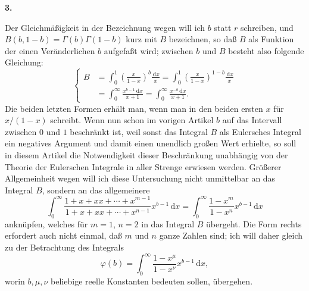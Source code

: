 \documentclass[11pt]{article}
\newcommand{\dd}{\,\mathrm d}
\newcommand{\art}[1]{\bigskip\begin{center}\large\bfseries #1.\end{center}\nopagebreak}
\begin{document}
\art{3}

Der Gleichmäßigkeit in der Bezeichnung wegen will ich $b$ statt $r$ schreiben, und $B(b,1-b)=\Gamma(b)\Gamma(1-b)$ kurz mit $B$ bezeichnen, so daß $B$ als Funktion der einen Veränderlichen $b$ aufgefaßt wird; zwischen $b$ und $B$ besteht also folgende Gleichung:
\begin{equation}
\left\{
\begin{aligned}
B&=\int_0^1 \left(\frac{x}{1-x}\right)^b\frac{\dd x}{x}
  =\int_0^1 \left(\frac{x}{1-x}\right)^{1-b}\frac{\dd x}{x} \\
&=\int_0^\infty \frac{x^{b-1}\dd x}{x+1}
  =\int_0^\infty \frac{x^{-b}\dd x}{x+1}.
\end{aligned}
\right.
\tag{8}
\end{equation}
Die beiden letzten Formen erhält man, wenn man in den beiden ersten $x$ für $x/(1-x)$ schreibt. Wenn nun schon im vorigen Artikel $b$ auf das Intervall zwischen $0$ und $1$ beschränkt ist, weil sonst das Integral $B$ als Eulersches Integral ein negatives Argument und damit einen unendlich großen Wert erhielte, so soll in diesem Artikel die Notwendigkeit dieser Beschränkung unabhängig von der Theorie der Eulerschen Integrale in aller Strenge erwiesen werden. Größerer Allgemeinheit wegen will ich diese Untersuchung nicht unmittelbar an das Integral $B$, sondern an das allgemeinere
\[
\int_0^\infty \frac{1+x+xx+\cdots+x^{m-1}}{1+x+xx+\cdots+x^{n-1}}x^{b-1}\dd x
=\int_0^\infty \frac{1-x^m}{1-x^n}x^{b-1}\dd x
\]
anknüpfen, welches für $m=1$, $n=2$ in das Integral $B$ übergeht. Die Form rechts erfordert auch nicht einmal, daß $m$ und $n$ ganze Zahlen sind; ich will daher gleich zu der Betrachtung des Integrals
\begin{equation}
\varphi(b)=\int_0^\infty \frac{1-x^\mu}{1-x^\nu}x^{b-1}\dd x,
\tag{9}
\end{equation}
worin $b,\mu,\nu$ beliebige reelle Konstanten bedeuten sollen, übergehen.
\end{document}
